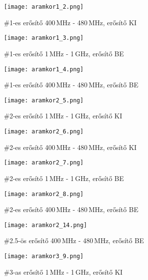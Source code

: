 \begin{figure}[!ht]
	\centering
	\texttt{[image: aramkor1\_2.png]}
	\caption{\#1-es erősítő 400\,MHz - 480\,MHz, erősítő KI}
	\label{fig:meres2}
\end{figure}

\begin{figure}[!ht]
	\centering
	\texttt{[image: aramkor1\_3.png]}
	\caption{\#1-es erősítő 1\,MHz - 1\,GHz, erősítő BE}
	\label{fig:meres3}
\end{figure}

\begin{figure}[!ht]
	\centering
	\texttt{[image: aramkor1\_4.png]}
	\caption{\#1-es erősítő 400\,MHz - 480\,MHz, erősítő BE}
	\label{fig:meres4}
\end{figure}



\begin{figure}[!ht]
	\centering
	\texttt{[image: aramkor2\_5.png]}
	\caption{\#2-es erősítő 1\,MHz - 1\,GHz, erősítő KI}
	\label{fig:meres5}
\end{figure}

\begin{figure}[!ht]
	\centering
	\texttt{[image: aramkor2\_6.png]}
	\caption{\#2-es erősítő 400\,MHz - 480\,MHz, erősítő KI}
	\label{fig:meres6}
\end{figure}

\begin{figure}[!ht]
	\centering
	\texttt{[image: aramkor2\_7.png]}
	\caption{\#2-es erősítő 1\,MHz - 1\,GHz, erősítő BE}
	\label{fig:meres7}
\end{figure}

\begin{figure}[!ht]
	\centering
	\texttt{[image: aramkor2\_8.png]}
	\caption{\#2-es erősítő 400\,MHz - 480\,MHz, erősítő BE}
	\label{fig:meres8}
\end{figure}

\begin{figure}[!ht]
	\centering
	\texttt{[image: aramkor2\_14.png]}
	\caption{\#2.5-ös erősítő 400\,MHz - 480\,MHz, erősítő BE}
	\label{fig:meres14}
\end{figure}



\begin{figure}[!ht]
	\centering
	\texttt{[image: aramkor3\_9.png]}
	\caption{\#3-as erősítő 1\,MHz - 1\,GHz, erősítő KI}
	\label{fig:meres9}
\end{figure}

